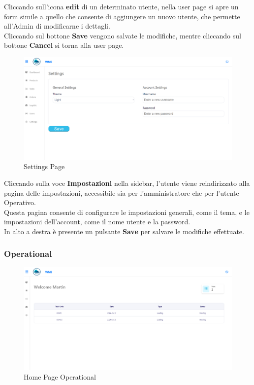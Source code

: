 Cliccando sull'icona \textbf{edit} di un determinato utente, nella user page si apre un form simile a quello che
consente di aggiungere un nuovo utente, che permette all'Admin di modificarne i dettagli.\\
Cliccando sul bottone \textbf{Save} vengono salvate le modifiche, mentre cliccando sul bottone \textbf{Cancel} si torna alla user page.

\begin{figure}[H]
    \centering
    \includegraphics[width=\textwidth]{document/sections/img/Storyboard/settingsPage.png}
    \caption{Settings Page}
    \label{fig:settingsPage}
\end{figure}

Cliccando sulla voce \textbf{Impostazioni} nella sidebar, l’utente viene reindirizzato alla pagina delle impostazioni,
accessibile sia per l'amministratore che per l'utente Operativo.\\
Questa pagina consente di configurare le impostazioni generali, come il tema, e le impostazioni dell'account, come il nome utente e la password.\\
In alto a destra è presente un pulsante \textbf{Save} per salvare le modifiche effettuate.

\subsubsection{Operational}

\begin{figure}[H]
    \centering
    \includegraphics[width=\textwidth]{document/sections/img/Storyboard/homePageOp.png}
        \caption{Home Page Operational}
    \label{fig:homePageOp}
\end{figure}

